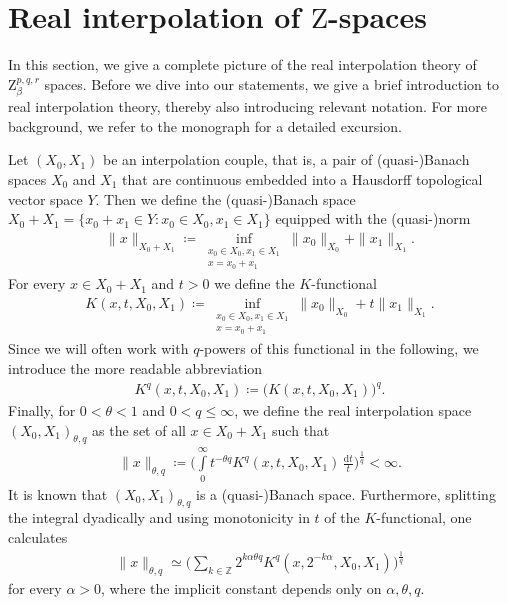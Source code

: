 \documentclass[11pt, leqno,parskip=half]{amsart}
\theoremstyle{definition}
\newcommand{\IZ}{\mathbb{Z}}
\newcommand{\Z}{\mathrm{Z}}
\renewcommand{\d}{\mathrm{d}}
\numberwithin{equation}{section}
\begin{document}
\section{Real interpolation of $\Z$-spaces}
\label{sec: real interpolation}
\noindent In this section, we give a complete picture of the real interpolation theory of $\Z^{p, q,r}_{\beta}$ spaces. Before we dive into our statements, we give a brief introduction to real interpolation theory, thereby also introducing relevant notation. For more background, we refer to the monograph \cite[Chp.\@ 3]{Bergh_Loefstroem} for a detailed excursion.

Let $(X_0,X_1)$ be an interpolation couple, that is, a pair of (quasi-)Banach spaces $X_0$ and $X_1$ that are continuous embedded into a Hausdorff topological vector space $Y$. Then we define the (quasi-)Banach space $X_0+X_1 = \{x_0+x_1 \in Y: x_0\in X_0, x_1\in X_1\}$  equipped with the (quasi-)norm
\begin{align*}
    \|x\|_{X_0+X_1} \coloneqq \inf\limits_{\substack{x_0\in X_0, x_1\in X_1\\ x=x_0+x_1}} \|x_0\|_{X_0} + \|x_1\|_{X_1}.
\end{align*}
For every $x\in X_0 + X_1$ and $t>0$ we define the $K$-functional
\begin{align*}
    K(x,t,X_0,X_1) \coloneqq \inf\limits_{\substack{x_0\in X_0, x_1\in X_1\\ x=x_0+x_1}} \|x_0\|_{X_0} + t\|x_1\|_{X_1}.
\end{align*}
Since we will often work with $q$-powers of this functional in the following, we introduce the more readable abbreviation
\begin{align*}
    K^q(x,t,X_0,X_1) \coloneqq \big(
    K(x,t,X_0,X_1)
    \big)^q.
\end{align*}
Finally, for $0<\theta<1$ and $0<q\leq \infty$, we define the real interpolation space $(X_0,X_1)_{\theta,q}$ as the set of all $x\in X_0+X_1$ such that
\begin{align*}
    \|x\|_{\theta,q} \coloneqq \bigg(\int\limits_0^\infty t^{-\theta q}  K^q(x,t,X_0,X_1) \, \frac{\d t}{t}\bigg)^\frac{1}{q}<\infty.
\end{align*}
It is known that $(X_0,X_1)_{\theta,q}$ is a (quasi-)Banach space. Furthermore, splitting the integral dyadically and using monotonicity in $t$ of the $K$-functional, one calculates
\begin{align}
\label{eq: dyadic int}
    \|x\|_{\theta,q} \simeq \Big(\sum\limits_{k\in\IZ} 2^{k\alpha\theta q} K^q(x,2^{-k\alpha},X_0,X_1)\Big)^\frac{1}{q}
\end{align}
for every $\alpha>0$, where the implicit constant depends only on $\alpha, \theta,q$.\\
\end{document}
